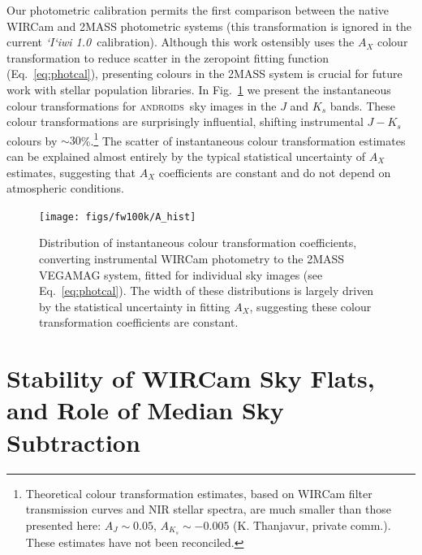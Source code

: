 \documentclass[iop]{emulateapj}
\newcommand{\sw}[1]{\textit{#1}} %
\newcommand{\iiwione}{\sw{`I`iwi 1.0}}
\newcommand{\androids}{\textsc{androids}}
\newcommand{\Fig}[1]{Fig.~\ref{fig:#1}}  %
\newcommand{\Eq}[1]{Eq.~\ref{eq:#1}}  %
\begin{document}
Our photometric calibration permits the first comparison between the native WIRCam and 2MASS photometric systems (this transformation is ignored in the current \iiwione\ calibration).
Although this work ostensibly uses the $A_X$ colour transformation to reduce scatter in the zeropoint fitting function (\Eq{photcal}), presenting colours in the 2MASS system is crucial for future work with stellar population libraries.
In \Fig{colourtrans} we present the instantaneous colour transformations for \androids\ sky images in the $J$ and $K_s$ bands.
These colour transformations are surprisingly influential, shifting instrumental $J-K_s$ colours by $\sim 30$\%.\footnote{Theoretical colour transformation estimates, based on WIRCam filter transmission curves and NIR stellar spectra, are much smaller than those presented here: $A_J\sim 0.05$, $A_{K_s}\sim -0.005$ (K. Thanjavur, private comm.). These estimates have not been reconciled.}
The scatter of instantaneous colour transformation estimates can be explained almost entirely by the typical statistical uncertainty of $A_X$ estimates, suggesting that $A_X$ coefficients are constant and do not depend on atmospheric conditions.

\begin{figure}[t]
 \centering
\texttt{[image: figs/fw100k/A\_hist]}
\caption{Distribution of instantaneous colour transformation coefficients, converting instrumental WIRCam photometry to the 2MASS VEGAMAG system, fitted for individual sky images (see \Eq{photcal}).
The width of these distributions is largely driven by the statistical uncertainty in fitting $A_X$, suggesting these colour transformation coefficients are constant.}
\label{fig:colourtrans}
\end{figure}


\section{Stability of WIRCam Sky Flats, and Role of Median Sky Subtraction}
\label{sec:skyflatstability}
\end{document}
